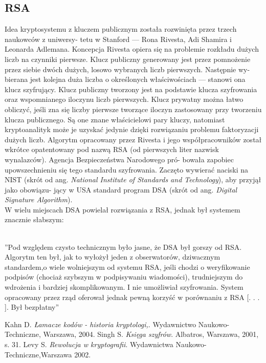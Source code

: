 \documentclass[a4paper]{article}
\begin{document}
\subsection{RSA}
Idea kryptosystemu z kluczem publicznym została rozwinięta przez trzech naukowców z uniwersy-
tetu w Stanford — Rona Rivesta, Adi Shamira i Leonarda Adlemana. Koncepcja Rivesta opiera
się na problemie rozkładu dużych liczb na czynniki pierwsze. Klucz publiczny generowany jest
przez pomnożenie przez siebie dwóch dużych, losowo wybranych liczb pierwszych. Następnie wy-
bierana jest kolejna duża liczba o określonych właściwościach — stanowi ona klucz szyfrujący.
Klucz publiczny tworzony jest na podstawie klucza szyfrowania oraz wspomnianego iloczynu liczb
pierwszych. Klucz prywatny można łatwo obliczyć, jeśli zna się liczby pierwsze tworzące iloczyn
zastosowany przy tworzeniu klucza publicznego. Są one znane właścicielowi pary kluczy, natomiast
kryptoanalityk może je uzyskać jedynie dzięki rozwiązaniu problemu faktoryzacji dużych liczb.
Algorytm opracowany przez Rivesta i jego współpracowników został wkrótce opatentowany pod
nazwą RSA (od pierwszych liter nazwisk wynalazców). Agencja Bezpieczeństwa Narodowego pró-
bowała zapobiec upowszechnieniu się tego standardu szyfrowania. Zaczęto wywierać naciski na
NIST (skrót od ang. \textit{National Institute of Standards and Technology}), aby przyjął jako obowiązu-
jący w USA standard program DSA (skrót od ang.\textit{ Digital Signature Algorithm}).\\
W wielu miejscach DSA powielał rozwiązania z RSA, jednak był systemem znacznie słabszym:\\
\\
\begin{center}
”Pod względem czysto technicznym było jasne, że DSA był gorszy od RSA. Algorytm ten był,
jak to wyłożył jeden z obserwatorów, dziwacznym standardem,o wiele wolniejszym od systemu
RSA, jeśli chodzi o weryfikowanie podpisów (chociaż szybszym w podpisywaniu wiadomości),
trudniejszym do wdrożenia i bardziej skomplikowanym. I nie umożliwiał szyfrowania. System
opracowany przez rząd oferował jednak pewną korzyść w porównaniu z RSA [. . . ]. Był
bezpłatny”\cite{3}
\end{center}

\begin{thebibliography}{1}
Kahn D.
\textit{Łamacze kodów - historia kryptologi,}.
Wydawnictwo Naukowo-Techniczne, Warszawa, 2004.
Singh S.
\textit{Księga szyfrów}.
Albatros, Warszawa, 2001, s. 31.
Levy S.
\textit{Rewolucja w kryptografii}.
Wydawnictwa Naukowo-Techniczne,Warszawa 2002.
\end{thebibliography}
\end{document}
